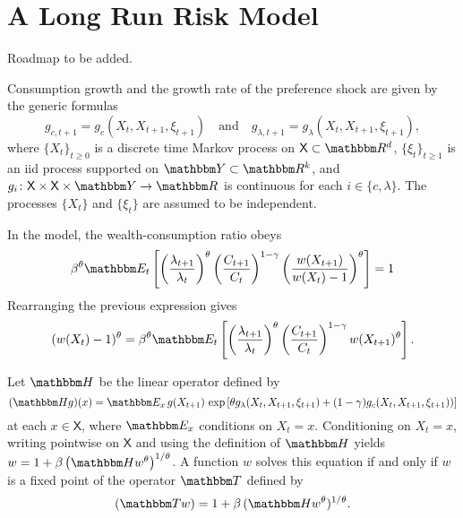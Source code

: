 \documentclass[12pt, reqno]{amsart}
\renewcommand{\geq}{\geqslant}
\newcommand{\1}{\mathbbm 1}
\newcommand{\RR}{\mathbbm R}
\newcommand{\TT}{\mathbbm T}
\newcommand{\YY}{\mathbbm Y}
\newcommand{\HH}{\mathbbm H}
\newcommand{\EE}{\mathbbm E}
\newcommand{\XX}{\mathsf X}
\theoremstyle{plain}
\theoremstyle{definition}
\begin{document}
\section{A Long Run Risk Model}

Roadmap to be added.

Consumption growth and the growth rate of the preference shock are given by
the generic formulas
%
\begin{equation}
    \label{eq:kappa}
    g_{c, t+1}
    = g_c(X_t, X_{t+1}, \xi_{t+1})
    \quad \text{and} \quad
    g_{\lambda, t+1}
    = g_\lambda(X_t, X_{t+1}, \xi_{t+1}),
\end{equation}
%
where $\{ X_t \}_{t \geq 0}$ is a discrete time Markov process on $\XX \subset \RR^d$, $\{
\xi_t \}_{t \geq 1}$ is an {\sc iid} process supported on $\YY \subset \RR^k$,
and $g_i \colon \XX \times \XX \times \YY \to \RR$ is continuous for
each $i \in \{c, \lambda\}$.  The processes $\{X_t\}$  and $\{\xi_t\}$ are
assumed to be independent.




In the model, the wealth-consumption ratio obeys
%
\begin{equation*}
    \beta^{\theta}
    \EE_t
    \left[
    \left( \frac{\lambda_{t+1}}{\lambda_t} \right)^\theta
        \left( \frac{C_{t+1}}{C_t} \right)^{1-\gamma}
        \left( \frac{w(X_{t+1})}{w(X_t)-1} \right)^\theta
    \right] = 1
\end{equation*}
%
Rearranging the previous expression gives
%
\begin{equation*}
    (w(X_t)-1)^\theta
    = \beta^{\theta}
    \EE_t
    \left[
    \left( \frac{\lambda_{t+1}}{\lambda_t} \right)^\theta
        \left( \frac{C_{t+1}}{C_t} \right)^{1-\gamma}
        w(X_{t+1})^\theta
    \right].
\end{equation*}
%

Let $\HH$ be the linear operator defined by
%
\begin{equation}\label{eq:defk}
    (\HH g)(x) = \EE_x 
        \, g(X_{t+1})  \,
        \exp
        \left[ 
            \theta g_\lambda(X_t, X_{t+1}, \xi_{t+1}) + (1-\gamma) g_c(X_t, X_{t+1}, \xi_{t+1}))
        \right]
\end{equation}
%
at each $x \in \XX$,  where $\EE_x$ conditions on $X_t = x$.
Conditioning on $X_t = x$, writing pointwise on $\XX$ and using the definition
of $\HH$ yields $w = 1 + \beta \left( \HH w^\theta \right)^{1/\theta}$.  A
function $w$ solves this equation if and only if $w$ is a fixed point
of the operator $\TT$ defined by 
%
\begin{equation}\label{eq:wcop}
    (\TT w) = 1 + \beta \,  (\HH w^\theta)^{1/\theta}.
\end{equation}
%
\end{document}
